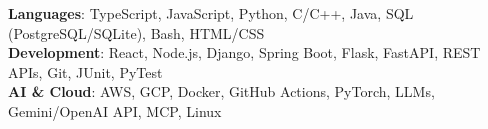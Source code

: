 \begin{itemize}[leftmargin=0.15in, label={}]
    \small{\item{
     \textbf{Languages}{: TypeScript, JavaScript, Python, C/C++, Java, SQL (PostgreSQL/SQLite), Bash, HTML/CSS} \\
     \textbf{Development}{: React, Node.js, Django, Spring Boot, Flask, FastAPI, REST APIs, Git, JUnit, PyTest} \\
     \textbf{AI \& Cloud}{: AWS, GCP, Docker, GitHub Actions, PyTorch, LLMs, Gemini/OpenAI API, MCP, Linux}
    }}
\end{itemize}
